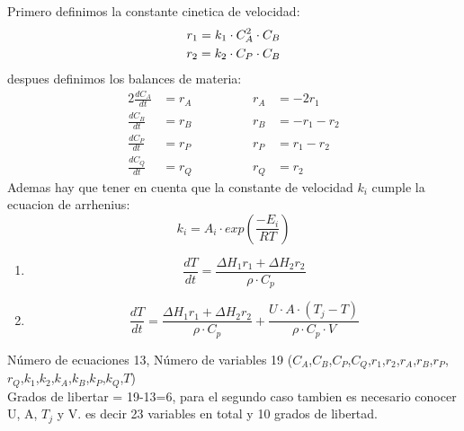 \solve{}
Primero definimos la constante cinetica de velocidad:
\begin{align*}
    r_1 = k_1 \cdot C_A^2 \cdot C_B \\
    \vspace{1em}
    r_2 = k_2 \cdot C_P \cdot C_B
\end{align*}
despues definimos los balances de materia:
\begin{alignat*}{2}
    \frac{dC_A}{dt} & = r_A & \hspace{4em} r_A & = -2r_1      \\
    \frac{dC_B}{dt} & = r_B & \hspace{4em} r_B & = -r_1 - r_2 \\
    \frac{dC_P}{dt} & = r_P & \hspace{4em} r_P & = r_1 - r_2  \\
    \frac{dC_Q}{dt} & = r_Q & \hspace{4em} r_Q & = r_2
\end{alignat*}
Ademas hay que tener en cuenta que la constante de velocidad $k_i$ cumple la ecuacion de arrhenius:
\begin{equation}
    k_i = A_i \cdot exp\left(\frac{-E_i}{RT}\right)
\end{equation}
\begin{enumerate}[label=\bfseries\tiny\protect\circled{\small\Alph*}]
    \item \begin{equation*}
              \frac{dT}{dt} = \frac{\Delta H_1 r_1 + \Delta H_2 r_2}{\rho \cdot C_p}
          \end{equation*}
    \item \begin{equation*}
              \frac{dT}{dt} = \frac{\Delta H_1 r_1 + \Delta H_2 r_2}{\rho \cdot C_p} + \frac{U \cdot A\cdot (T_j - T)}{\rho \cdot C_p \cdot V}
          \end{equation*}
\end{enumerate}
\vspace{1em}
\begin{flushleft}
    Número de ecuaciones 13, Número de variables 19 ($C_A$,$C_B$,$C_P$,$C_Q$,$r_1$,$r_2$,$r_A$,$r_B$,$r_P$,$r_Q$,$k_1$,$k_2$,$k_A$,$k_B$,$k_P$,$k_Q$,$T$)\\
    Grados de libertar = 19-13=6, para el segundo caso tambien es necesario conocer U, A, $T_j$ y V. es decir 23 variables en total y 10 grados de libertad.
\end{flushleft}
